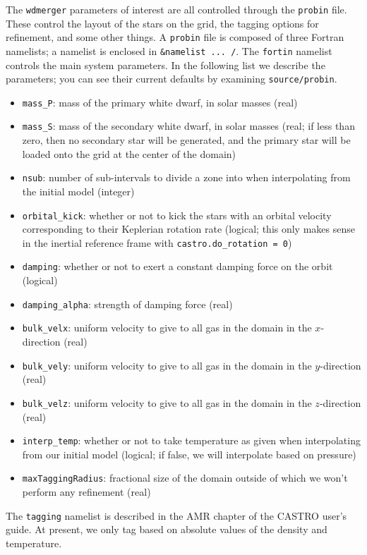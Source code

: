 \documentclass[12pt]{book}
\begin{document}
The \texttt{wdmerger} parameters of interest are all controlled through the \texttt{probin} file. 
These control the layout of the stars on the grid, the tagging options for refinement, and some other things. 
A \texttt{probin} file is composed of three Fortran namelists; a namelist is enclosed in 
\texttt{\&namelist ... /}. The \texttt{fortin} namelist controls the main system parameters. 
In the following list we describe the parameters; you can see their current defaults by 
examining \texttt{source/probin}.
\begin{itemize}
  \item \texttt{mass\_P}: mass of the primary white dwarf, in solar masses (real)
  \item \texttt{mass\_S}: mass of the secondary white dwarf, in solar masses (real; if less than zero, 
    then no secondary star will be generated, and the primary star will be loaded onto the grid at the 
    center of the domain)
  \item \texttt{nsub}: number of sub-intervals to divide a zone into when interpolating from the initial model (integer)
  \item \texttt{orbital\_kick}: whether or not to kick the stars with an orbital velocity corresponding to their 
    Keplerian rotation rate (logical; this only makes sense in the inertial reference frame with \texttt{castro.do\_rotation = 0})
  \item \texttt{damping}: whether or not to exert a constant damping force on the orbit (logical)
  \item \texttt{damping\_alpha}: strength of damping force (real)
  \item \texttt{bulk\_velx}: uniform velocity to give to all gas in the domain in the $x$-direction (real)
  \item \texttt{bulk\_vely}: uniform velocity to give to all gas in the domain in the $y$-direction (real)
  \item \texttt{bulk\_velz}: uniform velocity to give to all gas in the domain in the $z$-direction (real)
  \item \texttt{interp\_temp}: whether or not to take temperature as given when interpolating from our initial model (logical;
    if false, we will interpolate based on pressure)
  \item \texttt{maxTaggingRadius}: fractional size of the domain outside of which we won't perform any refinement (real)
\end{itemize}

The \texttt{tagging} namelist is described in the AMR chapter of the CASTRO user's guide. At present, we 
only tag based on absolute values of the density and temperature.
\end{document}
